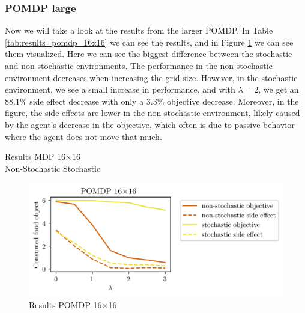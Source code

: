 \documentclass[12pt,A4]{report}
\theoremstyle{definition}
\begin{document}
\subsubsection{POMDP large}
Now we will take a look at the results from the larger POMDP. In Table \ref{tab:results_pomdp_16x16} we can see the results, and in Figure \ref{fig:results_pomdp_16x16} we can see them visualized. Here we can see the biggest difference between the stochastic and non-stochastic environments. The performance in the non-stochastic environment decreases when increasing the grid size. However, in the stochastic environment, we see a small increase in performance, and with $\lambda=2$, we get an $88.1\%$ side effect decrease with only a $3.3\%$ objective decrease. Moreover, in the figure, the side effects are lower in the non-stochastic environment, likely caused by the agent's decrease in the objective, which often is due to passive behavior where the agent does not move that much.

\begin{table}[H]
  \centering
  \caption{Results MDP 16$\times$16\\
  Non-Stochastic \hspace{130pt} Stochastic}
  \vspace{-10pt}
  
  
  \label{tab:results_pomdp_16x16}
\end{table}

\begin{figure}[H]
  \centering
  \includegraphics{"./figures/pomdp_16x16_result_plot.png"}
  \caption{Results POMDP 16$\times$16 }
  \label{fig:results_pomdp_16x16}
\end{figure}
\end{document}
